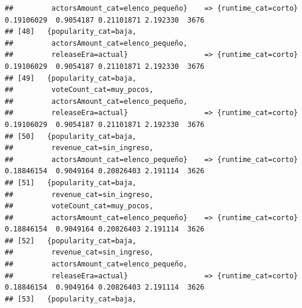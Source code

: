 \documentclass[
]{article}
\begin{document}
\begin{verbatim}
##         actorsAmount_cat=elenco_pequeño}    => {runtime_cat=corto}               0.19106029  0.9054187 0.21101871 2.192330  3676
## [48]   {popularity_cat=baja,                                                                                                    
##         actorsAmount_cat=elenco_pequeño,                                                                                        
##         releaseEra=actual}                  => {runtime_cat=corto}               0.19106029  0.9054187 0.21101871 2.192330  3676
## [49]   {popularity_cat=baja,                                                                                                    
##         voteCount_cat=muy_pocos,                                                                                                
##         actorsAmount_cat=elenco_pequeño,                                                                                        
##         releaseEra=actual}                  => {runtime_cat=corto}               0.19106029  0.9054187 0.21101871 2.192330  3676
## [50]   {popularity_cat=baja,                                                                                                    
##         revenue_cat=sin_ingreso,                                                                                                
##         actorsAmount_cat=elenco_pequeño}    => {runtime_cat=corto}               0.18846154  0.9049164 0.20826403 2.191114  3626
## [51]   {popularity_cat=baja,                                                                                                    
##         revenue_cat=sin_ingreso,                                                                                                
##         voteCount_cat=muy_pocos,                                                                                                
##         actorsAmount_cat=elenco_pequeño}    => {runtime_cat=corto}               0.18846154  0.9049164 0.20826403 2.191114  3626
## [52]   {popularity_cat=baja,                                                                                                    
##         revenue_cat=sin_ingreso,                                                                                                
##         actorsAmount_cat=elenco_pequeño,                                                                                        
##         releaseEra=actual}                  => {runtime_cat=corto}               0.18846154  0.9049164 0.20826403 2.191114  3626
## [53]   {popularity_cat=baja,                                                                                                    

\end{verbatim}
\end{document}
